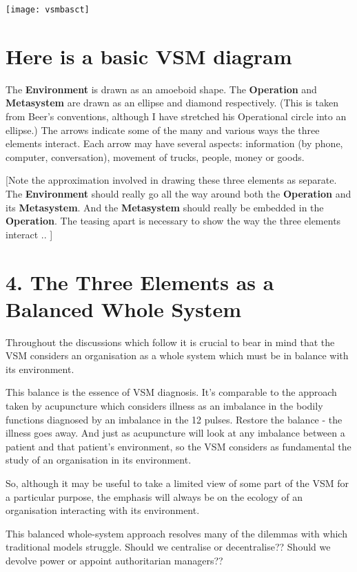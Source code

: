 \begin{center}
\texttt{[image: vsmbasct]}
\end{center}

\section*{Here is a basic VSM diagram}
The \textcolor{E}{\textbf{Environment}} is drawn as an amoeboid shape. The \textcolor{O}{\textbf{Operation}} and \textcolor{M}{\textbf{Metasystem}} are drawn as an ellipse and diamond respectively. (This is taken from Beer's conventions, although I have stretched his Operational circle into an ellipse.) The arrows indicate some of the many and various ways the three elements interact. Each arrow may have several aspects: information (by phone, computer, conversation), movement of trucks, people, money or goods.

{[}Note the approximation involved in drawing these three elements as separate. The \textcolor{E}{\textbf{Environment}} should really go all the way around both the \textcolor{O}{\textbf{Operation}} and its \textcolor{M}{\textbf{Metasystem}}. And the \textcolor{M}{\textbf{Metasystem}} should really be embedded in the \textcolor{O}{\textbf{Operation}}. The teasing apart is necessary to show the way the three elements interact .. {]}

\section*{4. The Three Elements as a Balanced Whole System}
Throughout the discussions which follow it is crucial to bear in mind that the VSM considers an organisation as a whole system which must be in balance with its environment.

This balance is the essence of VSM diagnosis. It's comparable to the approach taken by acupuncture which considers illness as an imbalance in the bodily functions diagnosed by an imbalance in the 12 pulses. Restore the balance - the illness goes away. And just as acupuncture will look at any imbalance between a patient and that patient's environment, so the VSM considers as fundamental the study of an organisation in its environment.

So, although it may be useful to take a limited view of some part of the VSM for a particular purpose, the emphasis will always be on the ecology of an organisation interacting with its environment.

This balanced whole-system approach resolves many of the dilemmas with which traditional models struggle. Should we centralise or decentralise?? Should we devolve power or appoint authoritarian managers??

